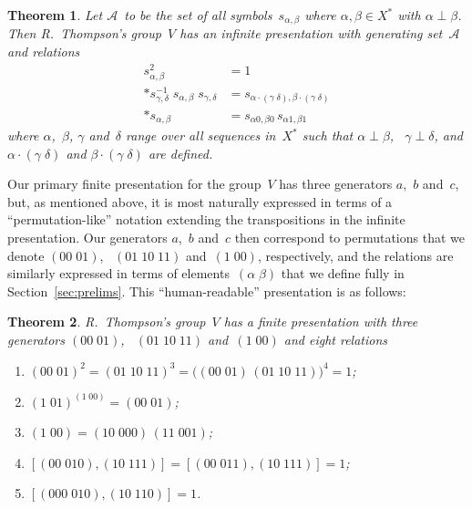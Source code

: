 \documentclass[a4paper,11pt]{article}
\numberwithin{equation}{section}
\newcommand{\A}{\mathcal{A}}
\newcommand{\R}{$\mathcal{R}$}
\newcommand{\swap}[2]{(#1\;#2)}
\newtheorem{thm}{Theorem}[section]
\renewcommand{\theenumi}{(\roman{enumi})}
\renewcommand{\labelenumi}{{\normalfont\theenumi}}
\begin{document}
\begin{thm}
  \label{thm:infpres}
  Let $\A$~to be the set of all symbols~$s_{\alpha,\beta}$ where
  $\alpha,\beta \in X^{\ast}$ with $\alpha \perp \beta$.  Then
  R.~Thompson's group~$V$ has an infinite presentation with generating
  set~$\A$ and relations
  \begin{equation}
  \begin{aligned}
    s_{\alpha,\beta}^{2} &= 1 \\*
    s_{\gamma,\delta}^{-1} \; s_{\alpha,\beta} \; s_{\gamma,\delta} &=
    s_{\alpha\cdot\swap{\gamma}{\delta},
      \beta\cdot\swap{\gamma}{\delta}} \\*
    s_{\alpha,\beta} &= s_{\alpha0,\beta0} \, s_{\alpha1,\beta1}
  \end{aligned}
  \label{eq:inf-rels}
  \end{equation}
  where $\alpha$,~$\beta$, $\gamma$ and~$\delta$ range over all
  sequences in~$X^{\ast}$ such that $\alpha \perp \beta$, \ $\gamma
  \perp \delta$, and $\alpha \cdot \swap{\gamma}{\delta}$ and $\beta
  \cdot \swap{\gamma}{\delta}$ are defined.
\end{thm}

Our primary finite presentation for the group~$V$ has three generators
$a$,~$b$ and~$c$, but, as mentioned above, it is most naturally
expressed in terms of a ``permutation-like'' notation extending the
transpositions in the infinite presentation.  Our generators $a$,~$b$
and~$c$ then correspond to permutations that we denote
$\swap{00}{01}$, \ $( 01 \; 10 \; 11 )$ and~$\swap{1}{00}$,
respectively, and the relations are similarly expressed in terms of
elements~$\swap{\alpha}{\beta}$ that we define fully in
Section~\ref{sec:prelims}.  This ``human-readable'' presentation is as
follows:

\begin{thm}
  \label{thm:main}
  R.~Thompson's group~$V$ has a finite presentation with three
  generators $\swap{00}{01}$, \ $(01 \; 10 \; 11)$ and~$\swap{1}{00}$
  and eight relations
\begin{enumerate}
  \renewcommand{\theenumi}{\R\arabic{enumi}}
  \renewcommand{\labelenumi}{\theenumi.}

\item
  \label{R:S4}
  $\swap{00}{01}^{2} = (01 \; 10 \; 11)^{3} =
  \bigl( \swap{00}{01} \, (01 \; 10 \; 11) \bigr)^{4} = 1$;

\item
  \label{R:12}
  $\swap{1}{01}^{\swap{1}{00}} = \swap{00}{01}$;

\item
  \label{R:split}
  $\swap{1}{00} = \swap{10}{000} \, \swap{11}{001}$;

\item
  \label{R:[23,23]}
  $[ \swap{00}{010} , \swap{10}{111} ] =
  [ \swap{00}{011} , \swap{10}{111} ] = 1$;

\item
  \label{R:[33,23]}
  $[ \swap{000}{010} , \swap{10}{110} ] = 1$.

\end{enumerate}  
\end{thm}
\end{document}

